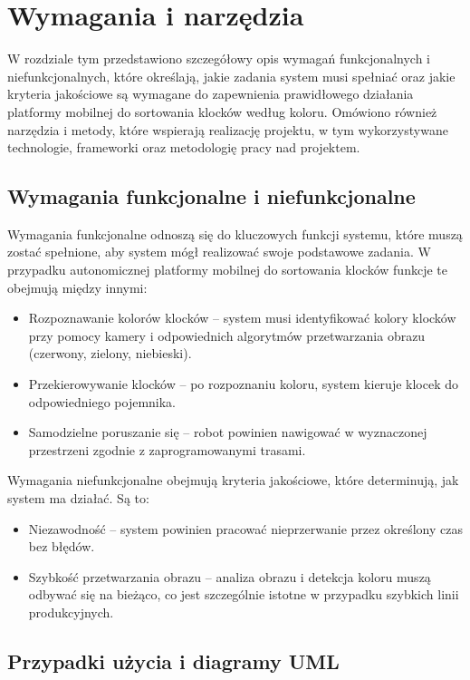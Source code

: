 \chapter{Wymagania i narzędzia}
\label{ch:wymagania-i-narzedzia}

W rozdziale tym przedstawiono szczegółowy opis wymagań funkcjonalnych i niefunkcjonalnych, które określają, jakie zadania system musi spełniać oraz jakie kryteria jakościowe są wymagane do zapewnienia prawidłowego działania platformy mobilnej do sortowania klocków według koloru. Omówiono również narzędzia i metody, które wspierają realizację projektu, w tym wykorzystywane technologie, frameworki oraz metodologię pracy nad projektem.

\section{Wymagania funkcjonalne i niefunkcjonalne}
Wymagania funkcjonalne odnoszą się do kluczowych funkcji systemu, które muszą zostać spełnione, aby system mógł realizować swoje podstawowe zadania. W przypadku autonomicznej platformy mobilnej do sortowania klocków funkcje te obejmują między innymi:
\begin{itemize}
    \item Rozpoznawanie kolorów klocków – system musi identyfikować kolory klocków przy pomocy kamery i odpowiednich algorytmów przetwarzania obrazu (czerwony, zielony, niebieski).
    \item Przekierowywanie klocków – po rozpoznaniu koloru, system kieruje klocek do odpowiedniego pojemnika.
    \item Samodzielne poruszanie się – robot powinien nawigować w wyznaczonej przestrzeni zgodnie z zaprogramowanymi trasami.
\end{itemize}

Wymagania niefunkcjonalne obejmują kryteria jakościowe, które determinują, jak system ma działać. Są to:

\begin{itemize}
    \item Niezawodność – system powinien pracować nieprzerwanie przez określony czas bez błędów.
    \item Szybkość przetwarzania obrazu – analiza obrazu i detekcja koloru muszą odbywać się na bieżąco, co jest szczególnie istotne w przypadku szybkich linii produkcyjnych.
\end{itemize}

\section{Przypadki użycia i diagramy UML}


